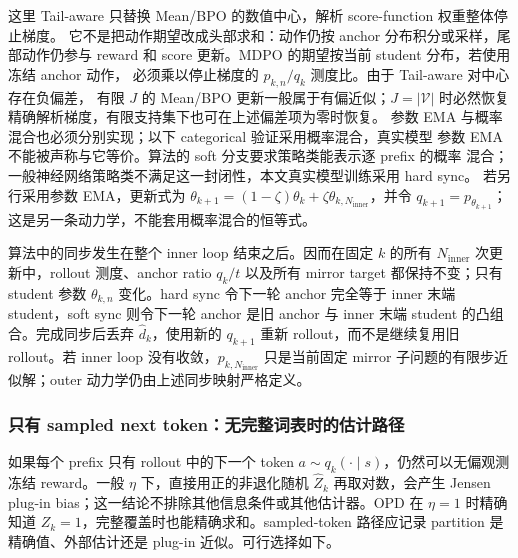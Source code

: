 这里 Tail-aware 只替换 Mean/BPO 的数值中心，解析 score-function 权重整体停止梯度。 它不是把动作期望改成头部求和：动作仍按 anchor 分布积分或采样，尾部动作仍参与 reward 和 score 更新。MDPO 的期望按当前 student 分布，若使用冻结 anchor 动作， 必须乘以停止梯度的 $p_{k,n}/q_k$ 测度比。由于 Tail-aware 对中心存在负偏差， 有限 $J$ 的 Mean/BPO 更新一般属于有偏近似；$J=|\mathcal V|$ 时必然恢复精确解析梯度，有限支持集下也可在上述偏差项为零时恢复。 参数 EMA 与概率混合也必须分别实现；以下 categorical 验证采用概率混合，真实模型 参数 EMA 不能被声称与它等价。算法的 soft 分支要求策略类能表示逐 prefix 的概率 混合；一般神经网络策略类不满足这一封闭性，本文真实模型训练采用 hard sync。 若另行采用参数 EMA，更新式为 $\theta_{k+1}=(1-\zeta)\theta_k+\zeta\theta_{k,N_{\mathrm{inner}}}$，并令 $q_{k+1}=p_{\theta_{k+1}}$；这是另一条动力学，不能套用概率混合的恒等式。

算法中的同步发生在整个 inner loop 结束之后。因而在固定 $k$ 的所有 $N_{\mathrm{inner}}$ 次更新中，rollout 测度、anchor ratio $q_k/t$ 以及所有 mirror target 都保持不变；只有 student 参数 $\theta_{k,n}$ 变化。hard sync 令下一轮 anchor 完全等于 inner 末端 student，soft sync 则令下一轮 anchor 是旧 anchor 与 inner 末端 student 的凸组合。完成同步后丢弃 $\widehat d_k$，使用新的 $q_{k+1}$ 重新 rollout，而不是继续复用旧 rollout。若 inner loop 没有收敛，$p_{k,N_{\mathrm{inner}}}$ 只是当前固定 mirror 子问题的有限步近似解；outer 动力学仍由上述同步映射严格定义。

\subsubsection*{只有 sampled next token：无完整词表时的估计路径}

如果每个 prefix 只有 rollout 中的下一个 token $a\sim q_k(\cdot\mid s)$，仍然可以无偏观测冻结 reward。一般 $\eta$ 下，直接用正的非退化随机 $\widehat Z_k$ 再取对数，会产生 Jensen plug-in bias；这一结论不排除其他信息条件或其他估计器。OPD 在 $\eta=1$ 时精确知道 $Z_k=1$，完整覆盖时也能精确求和。sampled-token 路径应记录 partition 是精确值、外部估计还是 plug-in 近似。可行选择如下。

